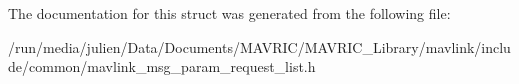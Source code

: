 The documentation for this struct was generated from the following file\+:\begin{DoxyCompactItemize}
\item 
/run/media/julien/\+Data/\+Documents/\+M\+A\+V\+R\+I\+C/\+M\+A\+V\+R\+I\+C\+\_\+\+Library/mavlink/include/common/mavlink\+\_\+msg\+\_\+param\+\_\+request\+\_\+list.\+h\end{DoxyCompactItemize}
